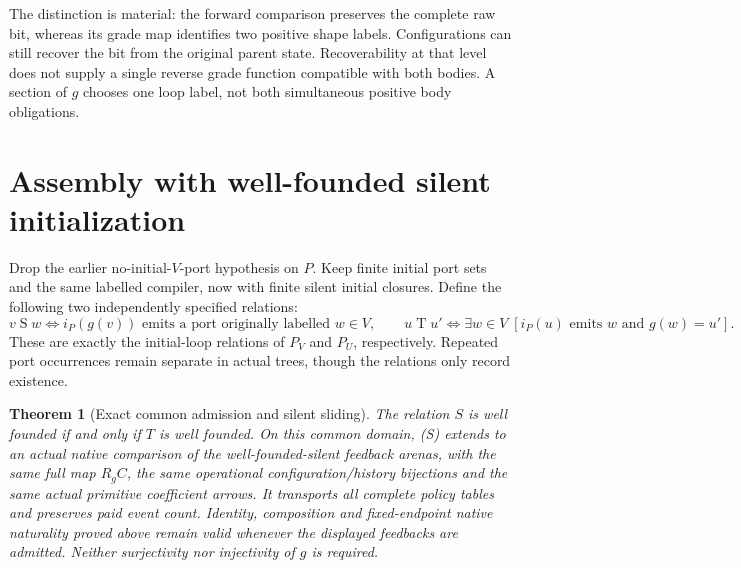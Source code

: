 \documentclass[11pt]{article}
\newtheorem{theorem}{Theorem}\newtheorem{proposition}{Proposition}
\begin{document}
The distinction is material: the forward comparison preserves the complete raw bit, whereas its grade map identifies two positive shape labels. Configurations can still recover the bit from the original parent state. Recoverability at that level does not supply a single reverse grade function compatible with both bodies. A section of $g$ chooses one loop label, not both simultaneous positive body obligations.

\section{Assembly with well-founded silent initialization}
Drop the earlier no-initial-$V$-port hypothesis on $P$. Keep finite initial
port sets and the same labelled compiler, now with finite silent initial
closures. Define the following two independently specified relations:
\[
 v\mathrel{S}w\iff i_P(g(v))\text{ emits a port originally labelled }w\in V,
 \qquad
 u\mathrel{T}u'\iff \exists w\in V\;
 [i_P(u)\text{ emits }w\text{ and }g(w)=u'].
\]
These are exactly the initial-loop relations of $P_V$ and $P_U$, respectively.
Repeated port occurrences remain separate in actual trees, though the
relations only record existence.
\begin{theorem}[Exact common admission and silent sliding]
The relation $S$ is well founded if and only if $T$ is well founded.
On this common domain, (S) extends to an actual native comparison of the
well-founded-silent feedback arenas, with the same full map $R_g C$,
the same operational configuration/history bijections and the same actual
primitive coefficient arrows. It transports all complete policy tables and
preserves paid event count. Identity, composition and fixed-endpoint native
naturality proved above remain valid whenever the displayed feedbacks are
admitted. Neither surjectivity nor injectivity of $g$ is required.
\end{theorem}
\end{document}
